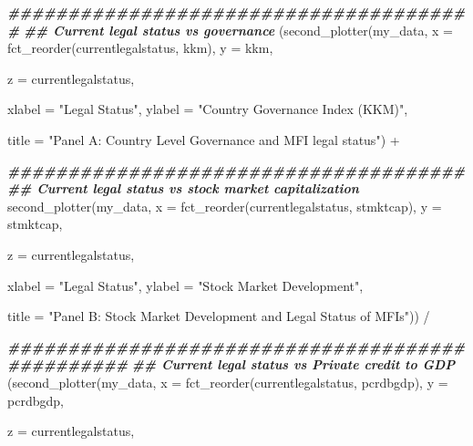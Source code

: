 \documentclass[a4paper,nobind]{templates/ociamthesis}
\newenvironment{Shaded}{\begin{snugshade}}{\end{snugshade}}
\newcommand{\AttributeTok}[1]{\textcolor[rgb]{0.77,0.63,0.00}{#1}}
\newcommand{\DocumentationTok}[1]{\textcolor[rgb]{0.56,0.35,0.01}{\textbf{\textit{#1}}}}
\newcommand{\FunctionTok}[1]{\textcolor[rgb]{0.00,0.00,0.00}{#1}}
\newcommand{\NormalTok}[1]{#1}
\newcommand{\SpecialCharTok}[1]{\textcolor[rgb]{0.00,0.00,0.00}{#1}}
\newcommand{\StringTok}[1]{\textcolor[rgb]{0.31,0.60,0.02}{#1}}
\renewenvironment{Shaded}
{
  \vspace{10pt}%
  \begin{snugshade}%
}{%
  \end{snugshade}%
  \vspace{8pt}%
}
\begin{document}
\begin{landscape}
\begin{Shaded}
\begin{Highlighting}[]
\DocumentationTok{\#\#\#\#\#\#\#\#\#\#\#\#\#\#\#\#\#\#\#\#\#\#\#\#\#\#\#\#\#\#\#\#\#\#\#\#\#\#\#}
\DocumentationTok{\#\# Current legal status vs governance}
\NormalTok{(}\FunctionTok{second\_plotter}\NormalTok{(my\_data, }\AttributeTok{x =} \FunctionTok{fct\_reorder}\NormalTok{(currentlegalstatus, kkm), }\AttributeTok{y =}\NormalTok{ kkm, }
               
               \AttributeTok{z =}\NormalTok{ currentlegalstatus, }
               
               \AttributeTok{xlabel =} \StringTok{"Legal Status"}\NormalTok{, }\AttributeTok{ylabel =} \StringTok{"Country Governance Index (KKM)"}\NormalTok{, }
               
               \AttributeTok{title =} \StringTok{"Panel A: Country Level Governance and MFI legal status"}\NormalTok{) }\SpecialCharTok{+}



\DocumentationTok{\#\#\#\#\#\#\#\#\#\#\#\#\#\#\#\#\#\#\#\#\#\#\#\#\#\#\#\#\#\#\#\#\#\#\#\#\#\#}
\DocumentationTok{\#\# Current legal status vs stock market capitalization}
\FunctionTok{second\_plotter}\NormalTok{(my\_data, }\AttributeTok{x =} \FunctionTok{fct\_reorder}\NormalTok{(currentlegalstatus, stmktcap), }\AttributeTok{y =}\NormalTok{ stmktcap, }
               
               \AttributeTok{z =}\NormalTok{ currentlegalstatus, }
               
               \AttributeTok{xlabel =} \StringTok{"Legal Status"}\NormalTok{, }\AttributeTok{ylabel =} \StringTok{"Stock Market Development"}\NormalTok{, }
               
               \AttributeTok{title =} \StringTok{"Panel B: Stock Market Development and Legal Status of MFIs"}\NormalTok{)) }\SpecialCharTok{/}




\DocumentationTok{\#\#\#\#\#\#\#\#\#\#\#\#\#\#\#\#\#\#\#\#\#\#\#\#\#\#\#\#\#\#\#\#\#\#\#\#\#\#\#\#\#\#\#\#\#\#\#\#}
\DocumentationTok{\#\# Current legal status vs Private credit to GDP}
\NormalTok{(}\FunctionTok{second\_plotter}\NormalTok{(my\_data, }\AttributeTok{x =} \FunctionTok{fct\_reorder}\NormalTok{(currentlegalstatus, pcrdbgdp), }\AttributeTok{y =}\NormalTok{ pcrdbgdp, }
               
               \AttributeTok{z =}\NormalTok{ currentlegalstatus, }
               

\end{Highlighting}
\end{Shaded}
\end{landscape}
\end{document}
